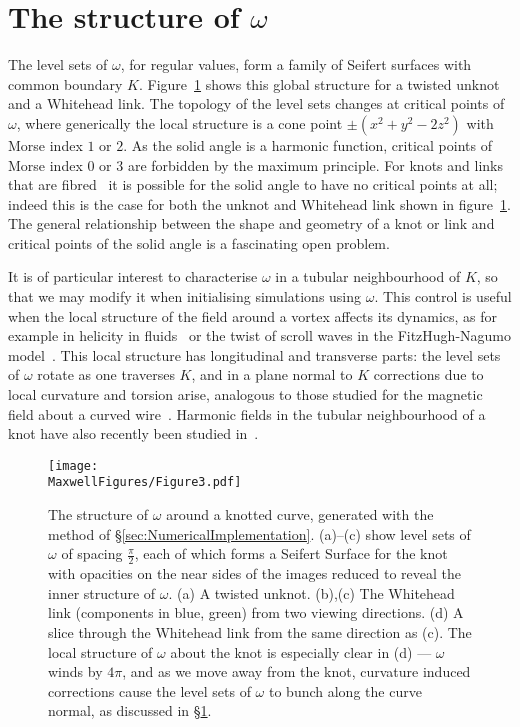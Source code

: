     \section{The structure of $\omega$}
    \label{sec:LocalStructure}

    The level sets of $\omega$, for regular values, form a family of Seifert surfaces with common boundary $K$. Figure~\ref{fig:SolidAngle} shows this global structure for a twisted unknot and a Whitehead link. 
    The topology of the level sets changes at critical points of $\omega$, where generically the local structure is a cone point $\pm(x^2+y^2-2z^2)$ with Morse index $1$ or $2$. As the solid angle is a harmonic function, critical points of Morse index $0$ or $3$ are forbidden by the maximum principle. For knots and links that are fibred~\citep{Stallings1978} it is possible for the solid angle to have no critical points at all; indeed this is the case for both the unknot and Whitehead link shown in figure~\ref{fig:SolidAngle}. The general relationship between the shape and geometry of a knot or link and critical points of the solid angle is a fascinating open problem. 

    It is of particular interest to characterise $\omega$ in a tubular neighbourhood of $K$, so that we may modify it when initialising simulations using $\omega$. This control is useful when the local structure of the field around a vortex affects its dynamics, as for example in helicity in fluids~\citep{Moffat1992} or the twist of scroll waves in the FitzHugh-Nagumo model~\citep{Winfree1984,Maucher2018}. This local structure has longitudinal and transverse parts: the level sets of $\omega$ rotate as one traverses $K$, and in a plane normal to $K$ corrections due to local curvature and torsion arise, analogous to those studied for the magnetic field about a curved wire~\citep{Saffman1992}. Harmonic fields in the tubular neighbourhood of a knot have also recently been studied in~\citep{Duan2018}. 

    \begin{figure}[htbp]
        \begin{centering}
            \texttt{[image: \\MaxwellFigures/Figure3.pdf]}
            \caption[The structure of solid angle around a knotted curve.]{The structure of $\omega$ around a knotted curve, generated with the method of \S\ref{sec:NumericalImplementation}. (a)--(c) show level sets of $\omega$ of spacing $\frac{\pi}{2}$, each of which forms a Seifert Surface for the knot with opacities on the near sides of the images reduced to reveal the inner structure of $\omega$. (a) A twisted unknot. (b),(c) The Whitehead link (components in blue, green) from two viewing directions. (d) A slice through the Whitehead link from the same direction as (c). The local structure of $\omega$ about the knot is especially clear in (d) --- $\omega$ winds by $4 \pi$, and as we move away from the knot, curvature induced corrections cause the level sets of $\omega$ to bunch along the curve normal, as discussed in \S\ref{sec:LocalStructure}.}
            \label{fig:SolidAngle}
        \end{centering}
    \end{figure}


